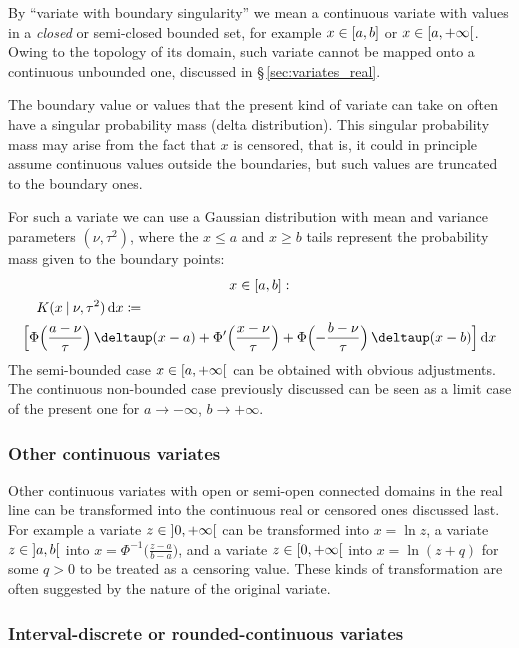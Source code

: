 \documentclass[a4paper,12pt,%
onecolumn,oneside,article,%
british%
]{memoir}
\newcommand*{\delt}{\deltaup}%
\newcommand*{\di}{\mathop{}\!\mathrm{d}}%
\newcommand*{\defd}{\coloneqq}
\DeclarePairedDelimiter\clcl{[}{]}
\DeclarePairedDelimiter\clop{[}{[}
\DeclarePairedDelimiter\opop{]}{[}%
\renewcommand*{\|}[1][]{\nonscript\:#1\vert\nonscript\:\mathopen{}}
\newcommand*{\sect}{\S}%
\newcommand*{\mud}{\nu}
\newcommand*{\sigmad}{\tau}
\begin{document}
By \enquote{variate with boundary singularity} we mean a continuous variate with values in a \emph{closed} or semi-closed bounded set, for example $x \in \clcl{a,b}$ or $x \in \clop{a,+\infty}$. Owing to the topology of its domain, such variate cannot be mapped onto a continuous unbounded one, discussed in \sect\,\ref{sec:variates_real}.

The boundary value or values that the present kind of variate can take on often have a singular probability mass (delta distribution). This singular probability mass may arise from the fact that $x$ is censored, that is, it could in principle assume continuous values outside the boundaries, but such values are truncated to the boundary ones.

For such a variate we can use a Gaussian distribution with mean and variance parameters $(\mud,\sigmad^{2})$, where the $x \le a$ and $x \ge b$ tails represent the probability mass given to the boundary points:
\begin{multline}
  \label{eq:K_cens}
  x \in \clcl{a,b}:
  \\
  \shoveleft{K(x \| \mud, \sigmad^{2})\di x \defd {}}
  \\
  \Bigl[
  \Phi\Bigl(
  \frac{a - \mud}{\sigmad}
  \Bigr)\,\delt(x-a)
  +
  \Phi'\Bigl(
  \frac{x - \mud}{\sigmad}
  \Bigr)
  +
  \Phi\Bigl(
  -\frac{b - \mud}{\sigmad}
  \Bigr)\,\delt(x-b)
  \Bigr]\di x
\end{multline}
The semi-bounded case $x \in \clop{a,+\infty}$ can be obtained with obvious adjustments. The continuous non-bounded case previously discussed can be seen as a limit case of the present one for $a\to -\infty$, $b\to +\infty$.

\subsubsection{Other continuous variates}
\label{sec:variates_other}

Other continuous variates with open or semi-open connected domains in the real line can be transformed into the continuous real or censored ones discussed last. For example a variate $z \in \opop{0, +\infty}$ can be transformed into $x=\ln z$, a variate $z \in \opop{a,b}$ into $x=\Phi^{-1}\bigl(\frac{z-a}{b-a}\bigr)$, and a variate $z \in \clop{0, +\infty}$ into $x=\ln(z+q)$ for some $q > 0$ to be treated as a censoring value. These kinds of transformation are often suggested by the nature of the original variate.

\subsubsection{Interval-discrete or rounded-continuous variates}
\label{sec:variates_rounded}
\end{document}

